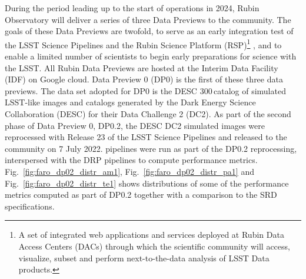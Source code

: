 During the period leading up to the start of operations in 2024, Rubin Observatory will deliver a series of three Data Previews to the community. 
The goals of these Data Previews are twofold, to serve as an early integration test of the LSST Science Pipelines and the Rubin Science Platform (RSP)\footnote{A set of integrated web applications and services deployed at Rubin Data Access Centers (DACs) through which the scientific community will access, visualize, subset and perform next-to-the-data analysis of LSST Data products.} \cite{lse-319}, and to enable a limited number of scientists to begin early preparations for science with the LSST.
All  Rubin Data Previews are hosted at the Interim Data Facility (IDF) on Google cloud\cite{2021arXiv211115030O}.
Data Preview 0 (DP0) \cite{RTN-001} is the first of these three data previews.
The data set adopted for DP0 is the DESC 300\,\degsq catalog of simulated LSST-like images and catalogs generated by the Dark Energy Science Collaboration (DESC) for their Data Challenge 2 (DC2)\cite{2021ApJS..253...31L}.
As part of the second phase of Data Preview 0, DP0.2, the DESC DC2 simulated images were reprocessed with Release 23 of the LSST Science Pipelines and released to the community on 7 July 2022.
\faro pipelines were run as part of the DP0.2 reprocessing, interspersed with the DRP pipelines to compute performance metrics. 
Fig.~\ref{fig:faro_dp02_distr_am1}, Fig.~\ref{fig:faro_dp02_distr_pa1} and Fig.~\ref{fig:faro_dp02_distr_te1} shows distributions of some of the performance metrics computed as part of DP0.2 together with a comparison to the SRD specifications. 
